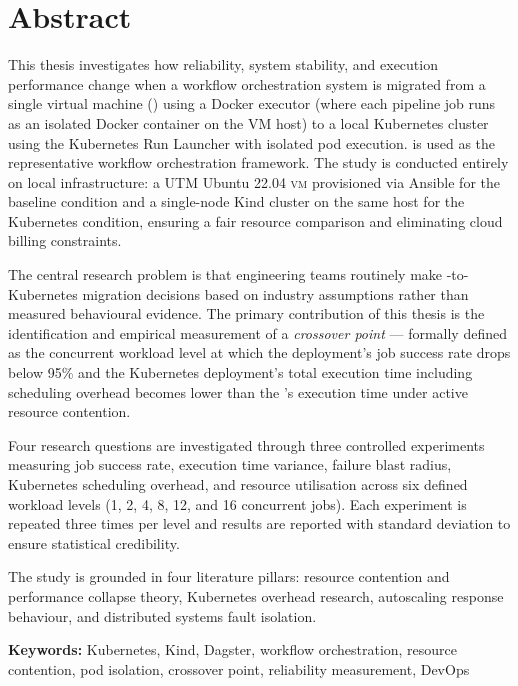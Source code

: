 \chapter*{Abstract}

This thesis investigates how reliability, system stability, and execution performance change
when a workflow orchestration system is migrated from a single virtual machine (\vm{}) using
a Docker executor (where each pipeline job runs as an isolated Docker container on the VM
host) to a local Kubernetes cluster using the Kubernetes Run Launcher with isolated pod
execution. \dagster{} is used as the representative workflow orchestration framework. The
study is conducted entirely on local infrastructure: a UTM Ubuntu 22.04 \textsc{vm}
provisioned via Ansible for the baseline condition and a single-node Kind cluster on the
same host for the Kubernetes condition, ensuring a fair resource comparison and eliminating
cloud billing constraints.

The central research problem is that engineering teams routinely make \vm{}-to-Kubernetes
migration decisions based on industry assumptions rather than measured behavioural evidence.
The primary contribution of this thesis is the identification and empirical measurement of a
\textit{crossover point} --- formally defined as the concurrent workload level at which
the \vm{} deployment's job success rate drops below 95\% and the Kubernetes deployment's
total execution time including scheduling overhead becomes lower than the \vm{}'s execution
time under active resource contention.

Four research questions are investigated through three controlled experiments measuring
job success rate, execution time variance, failure blast radius, Kubernetes scheduling
overhead, and resource utilisation across six defined workload levels (1, 2, 4, 8, 12, and
16 concurrent jobs). Each experiment is repeated three times per level and results are
reported with standard deviation to ensure statistical credibility.

The study is grounded in four literature pillars: resource contention and performance
collapse theory, Kubernetes overhead research, autoscaling response behaviour, and
distributed systems fault isolation.

\textbf{Keywords:} Kubernetes, Kind, Dagster, workflow orchestration, resource contention,
pod isolation, crossover point, reliability measurement, DevOps

\newpage

